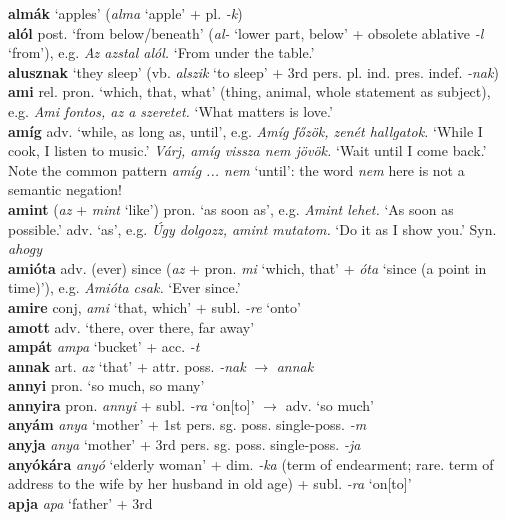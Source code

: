 \documentclass[11pt]{article}
\begin{document}
\textbf{almák} `apples' (\emph{alma} `apple' + pl. \emph{-k}) \\
\textbf{alól} post. `from below/beneath' (\emph{al-} `lower part, below' +
obsolete ablative \emph{-l} `from'), e.g. \emph{Az azstal alól.} `From under the
table.'\\
\textbf{alusznak} `they sleep' (vb. \emph{alszik} `to sleep' + 3rd
pers. pl. ind. pres. indef. \emph{-nak}) \\
\textbf{ami} rel. pron. `which, that, what' (thing, animal, whole statement as
subject), e.g. \emph{Ami fontos, az a szeretet.} `What matters is love.' \\
\textbf{amíg} adv. `while, as long as, until', e.g. \emph{Amíg főzök, zenét
hallgatok.} `While I cook, I listen to music.' \emph{Várj, amíg vissza nem
jövök.} `Wait until I come back.' Note the common pattern \emph{amíg
... nem} `until': the word \emph{nem} here is not a semantic negation!\\
\textbf{amint} (\emph{az} + \emph{mint} `like') pron. `as soon as',
e.g. \emph{Amint lehet.} `As soon as possible.' \textbar\textbar{}
adv. `as',  e.g. \emph{Úgy dolgozz, amint mutatom.} `Do it as I show you.' Syn. \emph{ahogy} \\
\textbf{amióta} adv. (ever) since (\emph{az} + pron. \emph{mi} `which, that'
+ \emph{óta} `since (a point in time)'), e.g. \emph{Amióta csak.} `Ever since.'
\\
\textbf{amire} conj, \emph{ami} `that, which' + subl. \emph{-re} `onto' \\
\textbf{amott} adv. `there, over there, far away' \\
\textbf{ampát} \emph{ampa} `bucket' + acc. \emph{-t} \\
\textbf{annak} art. \emph{az} `that' + attr. poss. \emph{-nak}
  $\rightarrow$ \emph{annak} \\
\textbf{annyi} pron. `so much, so many' \\
\textbf{annyira} pron. \emph{annyi} + subl. \emph{-ra}
`on[to]' $\rightarrow$ adv. `so much' \\
\textbf{anyám} \emph{anya} `mother' + 1st
pers. sg. poss. single\hyp{}poss. \emph{-m} \\
\textbf{anyja} \emph{anya} `mother' + 3rd
pers. sg. poss. single\hyp{}poss. \emph{-ja} \\
\textbf{anyókára} \emph{anyó} `elderly woman' + dim. \emph{-ka} (term
of endearment; rare. term of address to the wife by her husband in old
age) + subl. \emph{-ra} `on[to]' \\
\textbf{apja} \emph{apa} `father' + 3rd
\end{document}
